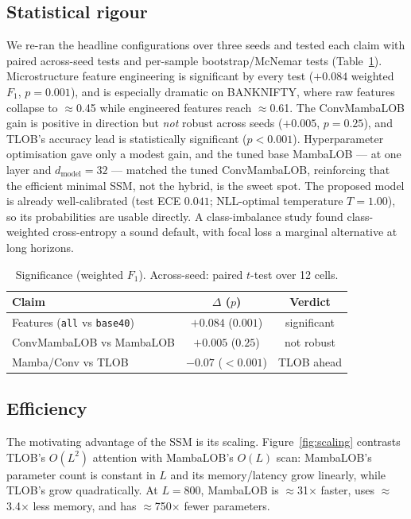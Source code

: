 \documentclass[10pt,twocolumn]{article}
\begin{document}
\subsection{Statistical rigour}
We re-ran the headline configurations over three seeds and tested each claim with paired across-seed tests
and per-sample bootstrap/McNemar tests (Table~\ref{tab:sig}). Microstructure feature engineering is
significant by every test ($+0.084$ weighted $F_1$, $p{=}0.001$), and is especially dramatic on BANKNIFTY,
where raw features collapse to $\approx$0.45 while engineered features reach $\approx$0.61. The ConvMambaLOB
gain is positive in direction but \emph{not} robust across seeds ($+0.005$, $p{=}0.25$), and TLOB's accuracy
lead is statistically significant ($p{<}0.001$). Hyperparameter optimisation gave only a modest gain, and the
tuned base MambaLOB --- at one layer and $d_{\mathrm{model}}{=}32$ --- matched the tuned ConvMambaLOB,
reinforcing that the efficient minimal SSM, not the hybrid, is the sweet spot. The proposed model is already
well-calibrated (test ECE $0.041$; NLL-optimal temperature $T{=}1.00$), so its probabilities are usable
directly. A class-imbalance study found class-weighted cross-entropy a sound default, with focal loss a
marginal alternative at long horizons.

\begin{table}[t]
\centering\footnotesize
\caption{Significance (weighted $F_1$). Across-seed: paired $t$-test over 12 cells.}
\label{tab:sig}
\begin{tabular}{@{}lcc@{}}
\toprule
Claim & $\Delta$ ($p$) & Verdict \\
\midrule
Features (\texttt{all} vs \texttt{base40}) & $+0.084$ ($0.001$) & significant \\
ConvMambaLOB vs MambaLOB & $+0.005$ ($0.25$) & not robust \\
Mamba/Conv vs TLOB       & $-0.07$ ($<0.001$) & TLOB ahead \\
\bottomrule
\end{tabular}
\end{table}

\subsection{Efficiency}
The motivating advantage of the SSM is its scaling. Figure~\ref{fig:scaling} contrasts TLOB's $O(L^2)$
attention with MambaLOB's $O(L)$ scan: MambaLOB's parameter count is constant in $L$ and its memory/latency
grow linearly, while TLOB's grow quadratically. At $L{=}800$, MambaLOB is $\approx$31$\times$ faster, uses
$\approx$3.4$\times$ less memory, and has $\approx$750$\times$ fewer parameters.
\end{document}

